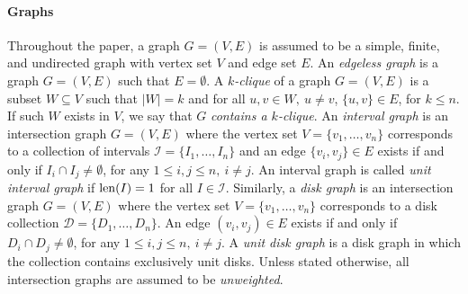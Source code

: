 \begin{toappendix}
\paragraph*{Graphs}
    Throughout the paper, a graph $G = (V,E)$ is assumed to be a simple, finite, and undirected graph with vertex set $V$ and edge set $E$.
    An \emph{edgeless graph} is a graph $G = (V, E)$ such that $E = \emptyset$.
    A $k$\emph{-clique} of a graph $G = (V, E)$ is a subset $W\subseteq V$ such that $|W| = k$ and for all $u,v \in W,\: u\neq v$, $\{u,v\} \in E$, for $k \le n$.
    If such $W$ exists in $V$, we say that $G$ \emph{contains a $k$-clique}.
    An \emph{interval graph} is an intersection graph $G = (V,E)$ where the vertex set $V = \{v_1,\ldots,v_n\}$ corresponds to a collection of intervals $\mathcal{I} = \{I_1,\ldots,I_n\}$ and an edge $\{v_i,v_j\} \in E$ exists if and only if $I_i \cap I_j \neq \emptyset$, for any $1\leq i,j \leq n,\: i \neq j$. 
    An interval graph is called \emph{unit interval graph} if $\mathrm{len}(I) = 1$ for all $I \in \mathcal{I}$.
    Similarly, a \emph{disk graph} is an intersection graph $G = (V,E)$ where the vertex set $V = \{v_1,\ldots,v_n\}$ corresponds to a disk collection $\mathcal{D} = \{D_1,\ldots,D_n\}$. An edge $(v_i,v_j) \in E$ exists if and only if $D_i \cap D_j \neq \emptyset$, for any $1\leq i,j \leq n,\: i \neq j$.
    A \emph{unit disk graph} is a disk graph in which the collection contains exclusively unit disks.
    Unless stated otherwise, all intersection graphs are assumed to be \emph{unweighted}. 

\end{toappendix}
